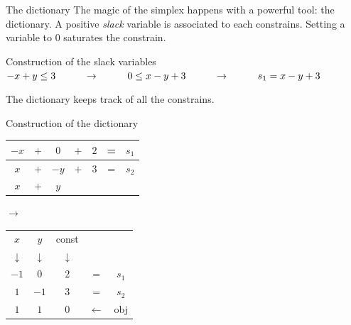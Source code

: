 \begin{frame}{The dictionary}
The magic of the simplex happens with a powerful tool: the dictionary.
A positive \emph{slack} variable is associated to each constrains. Setting a variable to $0$ saturates the constrain.
\begin{block}{Construction of the slack variables}
$-x+y\leq 3 \hspace*{1cm} \rightarrow \hspace*{1cm} 0 \leq x - y + 3 \hspace*{1cm} \rightarrow \hspace*{1cm} s_1 = x - y + 3$
\end{block}
The dictionary keeps track of all the constrains.
\begin{block}{Construction of the dictionary}
\begin{tabular}{| c  c  c  c  c | c c |}
	\hline	
   	$-x$ &$+$& $0$ & $+$ & $2$ & = & $s_1$\\ \hline	
   	$x$ &$+$& $-y$ & $+$ & $3$ & = & $s_2$\\ \hline \hline	
   	$x$ & $+$ & $y$ & & & &  \\
   	\hline	
\end{tabular}
$\rightarrow$
\begin{tabular}{| c | c || c || c c |}
	\hline	
	$x$ & $y$ & const & & \\
	$\downarrow$ &$\downarrow$ &$\downarrow$ & & \\
	\hline
	\hline	
   	$-1$ & $0$ & $2$ & = & $s_1$\\ \hline	
   	$1$ & $-1$ & $3$ & = & $s_2$\\ \hline \hline	
   	$1$ & $1$ & $0$ & $\leftarrow$ & obj \\
   	\hline	
\end{tabular}

\end{block}

\end{frame}

